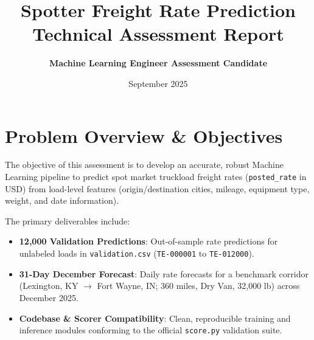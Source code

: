 \documentclass[11pt,a4paper]{article}
\title{\vspace{-1.5cm}\textbf{\LARGE Spotter Freight Rate Prediction}\\[0.3em]
\Large Technical Assessment Report}
\author{\textbf{Machine Learning Engineer Assessment Candidate}}
\date{September 2025}
\begin{document}
\maketitle
\vspace{-0.8cm}

\section{Problem Overview \& Objectives}
The objective of this assessment is to develop an accurate, robust Machine Learning pipeline to predict spot market truckload freight rates (\texttt{posted\_rate} in USD) from load-level features (origin/destination cities, mileage, equipment type, weight, and date information). 

The primary deliverables include:
\begin{itemize}
    \item \textbf{12,000 Validation Predictions}: Out-of-sample rate predictions for unlabeled loads in \texttt{validation.csv} (\texttt{TE-000001} to \texttt{TE-012000}).
    \item \textbf{31-Day December Forecast}: Daily rate forecasts for a benchmark corridor (Lexington, KY $\rightarrow$ Fort Wayne, IN; 360 miles, Dry Van, 32,000 lb) across December 2025.
    \item \textbf{Codebase \& Scorer Compatibility}: Clean, reproducible training and inference modules conforming to the official \texttt{score.py} validation suite.
\end{itemize}
\end{document}
